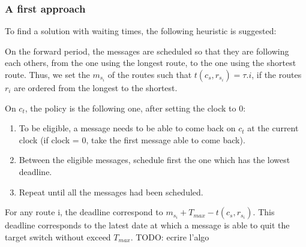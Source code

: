 \documentclass[a4paper,10pt]{article}
\newcommand{\todo}[1]{{\color{red} TODO: {#1}}}
\begin{document}
	

     \subsubsection{A first approach}
	  

      To find a solution with waiting times, the following heuristic is suggested:

      On the forward period, the messages are scheduled so that they are following each others, from the one using the longest route, to the one using the shortest route. Thus, we set the $m_{s_i}$ of the routes such that  $t(c_s,r_{s_i}) = \tau.i$, if the routes $r_i$ are ordered from the longest to the shortest.

      On $c_t$, the policy is the following one, after setting the clock to 0:
      \begin{enumerate}
      \item To be eligible, a message needs to be able to come back on $c_t$ at the current clock (if clock = 0, take the first message able to come back).
      \item Between the eligible messages, schedule first the one which has the lowest deadline.
      \item Repeat until all the messages had been scheduled.
      \end{enumerate}

      For any route i, the deadline correspond to $m_{s_i} + T_{max}-t(c_s,r_{s_i})$. This deadline corresponds to the latest date at which a message is able to quit the target switch without exceed $T_{max}$.
% 
% 
% 
\todo{ecrire l'algo}
\end{document}
